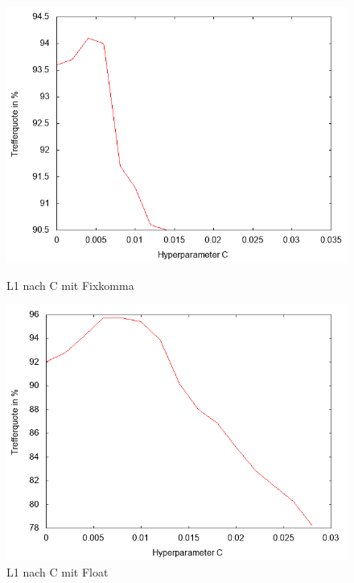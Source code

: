 \begin{figure}[ht]
\centering
	\begin{minipage}[b]{.45\linewidth}
  		\includegraphics[scale=0.4]{bilder/pareto_l1_MNIST}
  		\caption{L1 nach C mit Fixkomma}
  	\end{minipage}
  	\hspace{.05\linewidth}%
  	\begin{minipage}[b]{.45\linewidth}
  		\includegraphics[scale=0.4]{bilder/pareto_l1_float_single}
		\caption{L1 nach C mit Float}
	\end{minipage}
	\hspace{.05\linewidth}%
\end{figure}
